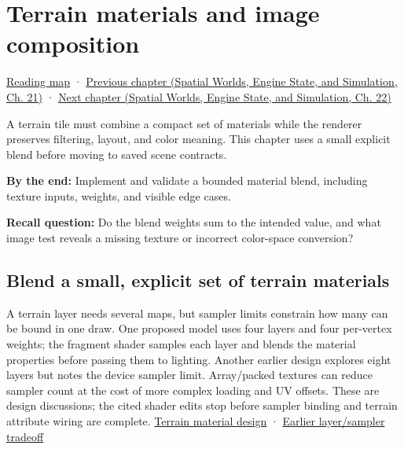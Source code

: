 \chapter{Terrain materials and image composition}\label{06-engine-ii-ch032-terrain-materials-and-image-composition}\hypertarget{06-engine-ii-ch032}{}\label{stagechapter:06-engine-ii-ch032}

\hypertarget{06-engine-ii-ch032-terrain-materials-and-image-composition}{}

\hyperref[volume-reading-map]{Reading map} · \href{../05-Spatial-Worlds-Engine-State-and-Simulation/main.pdf\#nameddest=06-engine-ii-ch031-spatial-index-serialization-and-query-evidence}{Previous chapter (Spatial Worlds, Engine State, and Simulation, Ch. 21)} · \href{../05-Spatial-Worlds-Engine-State-and-Simulation/main.pdf\#nameddest=06-engine-ii-ch033-versioned-scenes-and-transactional-loading}{Next chapter (Spatial Worlds, Engine State, and Simulation, Ch. 22)}

A terrain tile must combine a compact set of materials while the renderer preserves filtering, layout, and color meaning. This chapter uses a small explicit blend before moving to saved scene contracts.

\textbf{By the end:} Implement and validate a bounded material blend, including texture inputs, weights, and visible edge cases.

\textbf{Recall question:} Do the blend weights sum to the intended value, and what image test reveals a missing texture or incorrect color-space conversion?

\section{Blend a small, explicit set of terrain materials}\label{06-engine-ii-ch032-blend-a-small-explicit-set-of-terrain-materials}

\hypertarget{06-engine-ii-ch032-blend-a-small-explicit-set-of-terrain-materials}{}

A terrain layer needs several maps, but sampler limits constrain how many can be bound in one draw. One proposed model uses four layers and four per-vertex weights; the fragment shader samples each layer and blends the material properties before passing them to lighting. Another earlier design explores eight layers but notes the device sampler limit. Array/packed textures can reduce sampler count at the cost of more complex loading and UV offsets. These are design discussions; the cited shader edits stop before sampler binding and terrain attribute wiring are complete. \href{https://www.youtube.com/watch?v=vLzvpFaX50A}{Terrain material design} · \href{https://www.youtube.com/watch?v=unypFSvg7gI}{Earlier layer/sampler tradeoff}

